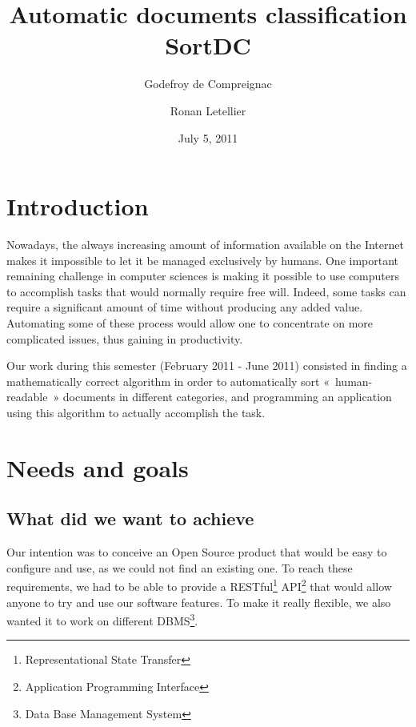 \documentclass[a4paper,11pt]{article}
\title{Automatic documents classification\\
SortDC}
\author{Godefroy de Compreignac \and Ronan Letellier}
\date{July 5, 2011}
\begin{document}

\maketitle

\setcounter{page}{0}
\thispagestyle{empty}



\clearpage
\tableofcontents{}



\clearpage
\section*{Introduction}

Nowadays, the always increasing amount of information available on the
Internet makes it impossible to let it be managed exclusively by humans. One
important remaining challenge in computer sciences is making it possible to
use computers to accomplish tasks that would normally require free will.
Indeed, some tasks can require a significant amount of time without producing
any added value. Automating some of these process would allow one to
concentrate on more complicated issues, thus gaining in productivity.

Our work during this semester (February 2011 - June 2011) consisted in finding
a mathematically correct algorithm in order to automatically sort
«~human-readable~» documents in different categories, and programming an
application using this algorithm to actually accomplish the task.



\section{Needs and goals}


\subsection{What did we want to achieve}

Our intention was to conceive an Open Source product that would be easy to
configure and use, as we could not find an existing one. To reach these
requirements, we had to be able to provide a RESTful\footnote{Representational
State Transfer} API\footnote{Application Programming Interface} that would allow anyone
to try and use our software features. To make it really flexible, we also
wanted it to work on different DBMS\footnote{Data Base Management System}.
\end{document}
